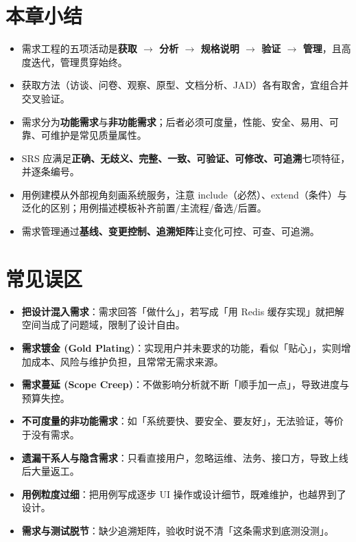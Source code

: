 \section{本章小结}

\begin{itemize}
    \item 需求工程的五项活动是\textbf{获取 $\to$ 分析 $\to$ 规格说明 $\to$ 验证 $\to$ 管理}，且高度迭代，管理贯穿始终。
    \item 获取方法（访谈、问卷、观察、原型、文档分析、JAD）各有取舍，宜组合并交叉验证。
    \item 需求分为\textbf{功能需求}与\textbf{非功能需求}；后者必须可度量，性能、安全、易用、可靠、可维护是常见质量属性。
    \item SRS 应满足\textbf{正确、无歧义、完整、一致、可验证、可修改、可追溯}七项特征，并逐条编号。
    \item 用例建模从外部视角刻画系统服务，注意 include（必然）、extend（条件）与泛化的区别；用例描述模板补齐前置/主流程/备选/后置。
    \item 需求管理通过\textbf{基线、变更控制、追溯矩阵}让变化可控、可查、可追溯。
\end{itemize}

\section{常见误区}

\begin{itemize}
    \item \textbf{把设计混入需求}：需求回答「做什么」，若写成「用 Redis 缓存实现」就把解空间当成了问题域，限制了设计自由。
    \item \textbf{需求镀金 (Gold Plating)}：实现用户并未要求的功能，看似「贴心」，实则增加成本、风险与维护负担，且常常无需求来源。
    \item \textbf{需求蔓延 (Scope Creep)}：不做影响分析就不断「顺手加一点」，导致进度与预算失控。
    \item \textbf{不可度量的非功能需求}：如「系统要快、要安全、要友好」，无法验证，等价于没有需求。
    \item \textbf{遗漏干系人与隐含需求}：只看直接用户，忽略运维、法务、接口方，导致上线后大量返工。
    \item \textbf{用例粒度过细}：把用例写成逐步 UI 操作或设计细节，既难维护，也越界到了设计。
    \item \textbf{需求与测试脱节}：缺少追溯矩阵，验收时说不清「这条需求到底测没测」。
\end{itemize}
